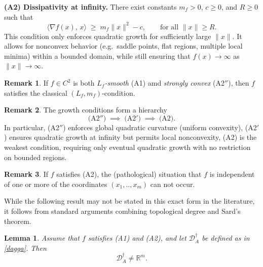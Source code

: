 \documentclass[11pt, a4paper,leqno]{amsart}
\newtheorem{lemma}{Lemma}[section]
\theoremstyle{definition}
\newtheorem{remark}{Remark}[section]
\numberwithin{equation}{section}
\begin{document}
\smallskip
\noindent\textbf{(A2) Dissipativity at infinity.}
There exist constants $m_f>0$, $c\ge0$, and $R\ge0$ such that
\begin{equation}\label{D}
\langle \nabla f(x),\,x\rangle
\;\ge\; m_f \|x\|^2 - c,
\qquad \text{for all }\|x\|\ge R.
\end{equation}
This condition only enforces quadratic growth for sufficiently large $\|x\|$.
It allows for nonconvex behavior (e.g.\ saddle points, flat regions, multiple local minima) within a bounded domain, while still ensuring that $f(x)\to\infty$ as $\|x\|\to\infty$.




\begin{remark}
If $f\in C^2$ is both \emph{$L_f$-smooth} (A1) amd \emph{strongly convex} (A2$''$), then $f$ satisfies the classical $(L_f,m_f)$-condition.
\end{remark}
\begin{remark}
The growth conditions form a hierarchy
\[
\text{(A2$''$)} \;\implies\; \text{(A2$'$)} \;\implies\; \text{(A2)}.
\]
In particular, (A2$''$) enforces global quadratic curvature (uniform convexity), (A2$'$) ensures quadratic growth at infinity but permits local nonconvexity, (A2) is the weakest condition, requiring only eventual quadratic growth with no restriction on bounded regions.
\end{remark}

\begin{remark} If $f$ satisfies \textnormal{(A2)}, the (pathological)
situation that $f$ is independent of one or more of the coordinates $(x_1,..,x_m)$ can  not occur.
\end{remark}

While the following result may not be stated in this exact form in the literature, it follows from standard arguments combining topological degree and Sard’s theorem.

\begin{lemma}\label{Redu}
Assume that $f$ satisfies \textnormal{(A1)} and \textnormal{(A2)}, and let $\mathcal D_A^\dagger$ be defined as in \eqref{dagga}. Then
\[
\mathcal D_A^\dagger \neq \mathbb R^m.
\]
\end{lemma}
\end{document}
